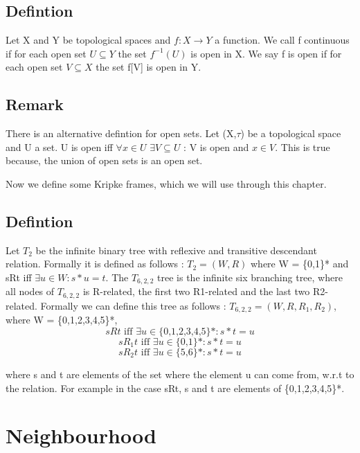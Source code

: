 \documentclass[12pt, a4paper]{scrreprt}
\begin{document}
\section{Defintion}
Let X and Y be topological spaces and $f : X \rightarrow Y$ a function.
We call f continuous if for each open set $U \subseteq Y$ the set $f^{-1}(U)$ is open in X. We say f 
is open if for each open set $V \subseteq X$ the set f[V] is open in Y.

\section{Remark}
There is an alternative defintion for open sets. Let (X,$\tau$) be a topological space and U a set.
U is open iff $\forall x \in U$  $\exists V\subseteq U$ : V is open and $x \in V$. This is true because,
the union of open sets is an open set.
\newline
\newline

Now we define some Kripke frames, which we will use through this chapter.

\section{Defintion}
Let $T_2$ be the infinite binary tree with reflexive and transitive descendant relation. \newline Formally it is defined as follows :
$T_2 = (W,R)$ where W = \{0,1\}* and sRt iff $\exists u\in W : s*u = t$. \newline
The $T_ {6,2,2}$ tree is the infinite six branching tree, where all nodes of $T_ {6,2,2}$ is R-related, the first two R1-related 
and the last two R2-related. Formally we can define this tree as follows : $T_ {6,2,2} = (W,R,R_1,R_2)$,
where W = \{{0,1,2,3,4,5}\}*, $$sRt \mbox{ iff } \exists u \in \mbox{\{0,1,2,3,4,5\}*} : s*t = u $$
$$ sR_1t  \mbox{ iff } \exists u \in \mbox{\{0,1\}*} : s*t = u$$
$$ sR_2t  \mbox{ iff } \exists u \in \mbox{\{5,6\}*} : s*t = u$$

where s and t are elements of the set where the element u can come from, w.r.t to the relation. For example in the case sRt,
s and t are elements of \{0,1,2,3,4,5\}*.





\chapter{Neighbourhood} 
\end{document}
